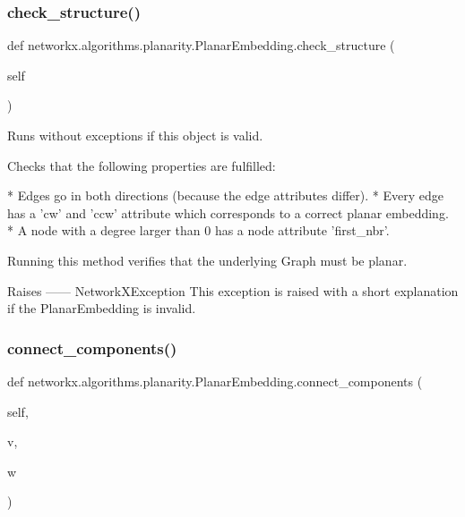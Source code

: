 \subsubsection{\texorpdfstring{check\+\_\+structure()}{check\_structure()}}
{\footnotesize\ttfamily def networkx.\+algorithms.\+planarity.\+Planar\+Embedding.\+check\+\_\+structure (\begin{DoxyParamCaption}\item[{}]{self }\end{DoxyParamCaption})}

\begin{DoxyVerb}Runs without exceptions if this object is valid.

Checks that the following properties are fulfilled:

* Edges go in both directions (because the edge attributes differ).
* Every edge has a 'cw' and 'ccw' attribute which corresponds to a
  correct planar embedding.
* A node with a degree larger than 0 has a node attribute 'first_nbr'.

Running this method verifies that the underlying Graph must be planar.

Raises
------
NetworkXException
    This exception is raised with a short explanation if the
    PlanarEmbedding is invalid.
\end{DoxyVerb}
 \mbox{\label{classnetworkx_1_1algorithms_1_1planarity_1_1PlanarEmbedding_a49f661cc1da51d624ea821680adc7229}} 
\subsubsection{\texorpdfstring{connect\+\_\+components()}{connect\_components()}}
{\footnotesize\ttfamily def networkx.\+algorithms.\+planarity.\+Planar\+Embedding.\+connect\+\_\+components (\begin{DoxyParamCaption}\item[{}]{self,  }\item[{}]{v,  }\item[{}]{w }\end{DoxyParamCaption})}

